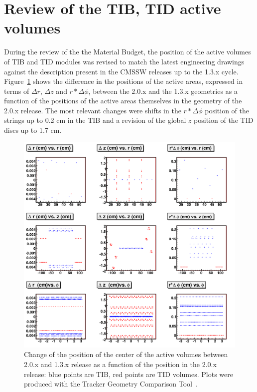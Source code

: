 \documentclass{cmspaper}
\begin{document}
\section{Review of the TIB, TID active volumes}
During the review of the the Material Budget, the position of the active
volumes of TIB and TID modules was revised to match the latest
engineering drawings against the description present in the CMSSW
releases up to the 1.3.x cycle.
Figure~\ref{fig:tibtid_active} shows the difference in the positions of
the active areas, expressed in terms of $\Delta r$, $\Delta z$ and
$r*\Delta\phi$, between the 2.0.x and the 1.3.x geometries as a function
of the positions of the active areas themselves in the geometry of the
2.0.x release. The most relevant changes were shifts in the
$r*\Delta\phi$ position of the strings up to 0.2 cm in the TIB and a
revision of the global $z$ position of the TID discs up to 1.7 cm.
\begin{figure}[hbtp]
  \begin{center}
  \includegraphics[width=0.7\linewidth]{fig/TIBTID_diff_vs_nom.png} 
    \caption{Change of the position of the center of the active
      volumes between 2.0.x and 1.3.x release as a function of the
      position in the 2.0.x release: blue points are TIB, red points are
      TID volumes. Plots were produced with the Tracker Geometry Comparison Tool~\cite{nnTool}.} 
    \label{fig:tibtid_active}
  \end{center}
\end{figure}

\end{document}
